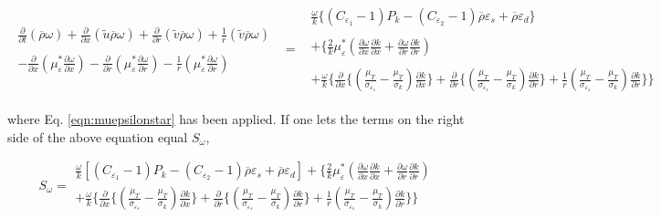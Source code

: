 \begin{displaymath}
	\begin{array}{ccc}
 	   \begin{array}{c}
	 \frac{\partial}{\partial t}(\overline{\rho}\omega)
	+ \frac{\partial}{\partial x}(\tilde u\overline{\rho}\omega)+ \frac{\partial}{\partial r}(\tilde v\overline{\rho}\omega)
	+ \frac{1}{r}(\tilde v\overline{\rho}\omega) \\ \\
	- \frac{\partial}{\partial x}(\mu^*_{\varepsilon}
	\frac{\partial \omega}{\partial x}) - \frac{\partial}{\partial r}(\mu^*_{\varepsilon}\frac{\partial \omega}{\partial r})
	- \frac{1}{r}(\mu^*_{\varepsilon}\frac{\partial \omega}{\partial r})
	   \end{array}
	& = &
	   \begin{array}{c}
		\frac{\omega}{k}\Big\{(C_{\varepsilon_1}- 1)P_k - (C_{\varepsilon_2}-1)\overline{\rho}\varepsilon_s
		+ \overline{\rho}\varepsilon_d \Big\} \\ \\
		+ \Bigg\{\frac{2}{k}\mu^*_{\varepsilon}(\frac{\partial \omega}{\partial x}\frac{\partial k}{\partial x} 
		+\frac{\partial \omega}{\partial r}\frac{\partial k}{\partial r}) 
		\\ \\ + \frac{\omega}{k}\Big\{
		\frac{\partial}{\partial x}\big\{(\frac{\mu_T}{\sigma_{\varepsilon_s}} - \frac{\mu_T}{\sigma_k})
		\frac{\partial k}{\partial x}\big\} 
		+ \frac{\partial}{\partial r}\big\{(\frac{\mu_T}{\sigma_{\varepsilon_s}} 
		- \frac{\mu_T}{\sigma_k})\frac{\partial k}{\partial r}\big\} + \frac{1}{r}(\frac{\mu_T}{\sigma_{\varepsilon_s}} 
		- \frac{\mu_T}{\sigma_k})\frac{\partial k}{\partial r}	\Big\} \Bigg\}
	   \end{array}
	\end{array}
\end{displaymath}

	where Eq. \ref{eqn:muepsilonstar} has been applied.  If one lets the terms on the right side of the above 
equation equal $S_\omega$,

\begin{equation}
	S_\omega = \begin{array}{c}
		\frac{\omega}{k}[(C_{\varepsilon_1}- 1)P_k - (C_{\varepsilon_2}-1)\overline{\rho}\varepsilon_s
		+ \overline{\rho}\varepsilon_d ] 
		+ \Bigg\{\frac{2}{k}\mu^*_{\varepsilon}(\frac{\partial \omega}{\partial x}\frac{\partial k}{\partial x} 
		+\frac{\partial \omega}{\partial r}\frac{\partial k}{\partial r}) 
		\\ + \frac{\omega}{k}\Big\{
		\frac{\partial}{\partial x}\big\{(\frac{\mu_T}{\sigma_{\varepsilon_s}} - \frac{\mu_T}{\sigma_k})
		\frac{\partial k}{\partial x}\big\} 
		+ \frac{\partial}{\partial r}\big\{(\frac{\mu_T}{\sigma_{\varepsilon_s}} 
		- \frac{\mu_T}{\sigma_k})\frac{\partial k}{\partial r}\big\} + \frac{1}{r}(\frac{\mu_T}{\sigma_{\varepsilon_s}} 
		- \frac{\mu_T}{\sigma_k})\frac{\partial k}{\partial r}	\Big\} \Bigg\}
	   \end{array}
\label{eqn:somega}
\end{equation}

